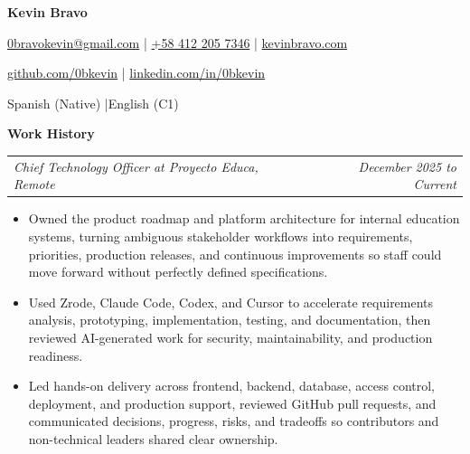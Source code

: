\documentclass[10pt,letterpaper]{article}
\makeatletter
\newcommand{\bodyfont}{\fontsize{10.5}{15.75}\selectfont}
\newcommand{\contactfont}{\fontsize{11.5}{14.5}\selectfont}
\newcommand{\sectiontitle}[1]{%
  \vspace{4pt}
  {\bodyfont\textbf{#1}}\par
  \nopagebreak[4]
  \vspace{2pt}
}
\newcommand{\roleline}[2]{%
  \begin{tabularx}{\textwidth}{@{}Xr@{}}
    \bodyfont\textit{#1} & \bodyfont\textit{#2}
  \end{tabularx}
  \nopagebreak[4]
  \vspace{1pt}
}
\makeatother
\begin{document}
\bodyfont
\raggedright

\begin{center}
  {\fontsize{14}{17}\selectfont\textbf{Kevin Bravo}}\par
  \vspace{3pt}
  {\contactfont
    \href{mailto:0bravokevin@gmail.com}{0bravokevin@gmail.com}
    \enspace|\enspace
    \href{tel:+584122057346}{+58 412 205 7346}
    \enspace|\enspace
    \href{https://kevinbravo.com}{kevinbravo.com}
  }\par
  {\contactfont
    \href{https://github.com/0bkevin}{github.com/0bkevin}
    \enspace|\enspace
    \href{https://www.linkedin.com/in/0bkevin/}{linkedin.com/in/0bkevin}
  }\par
  {\contactfont Spanish (Native) \enspace|\enspace English (C1)}
\end{center}

\sectiontitle{Work History}

\roleline{Chief Technology Officer at Proyecto Educa, Remote}{December 2025 to Current}
\begin{itemize}
  \item Owned the product roadmap and platform architecture for internal education systems, turning ambiguous stakeholder workflows into requirements, priorities, production releases, and continuous improvements so staff could move forward without perfectly defined specifications.
  \item Used Zrode, Claude Code, Codex, and Cursor to accelerate requirements analysis, prototyping, implementation, testing, and documentation, then reviewed AI-generated work for security, maintainability, and production readiness.
  \item Led hands-on delivery across frontend, backend, database, access control, deployment, and production support, reviewed GitHub pull requests, and communicated decisions, progress, risks, and tradeoffs so contributors and non-technical leaders shared clear ownership.
\end{itemize}
\end{document}
